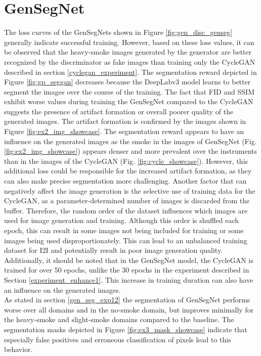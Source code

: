 \section{GenSegNet}\label{genseg_discussion}
The loss curves of the GenSegNets shown in Figure \ref{fig:gen_disc_genseg} generally indicate successful training.
However, based on these loss values, it can be observed that the heavy-smoke images generated by the generator are better recognized by the discriminator as fake images than training only the CycleGAN described in section \ref{cyclegan_experiment}.
The segmentation reward depicted in Figure \ref{fig:gp_seggan} decreases because the DeepLabv3 model learns to better segment the images over the course of the training.
The fact that FID and SSIM exhibit worse values during training the GenSegNet compared to the CycleGAN suggests the presence of artifact formation or overall poorer quality of the generated images.
The artifact formation is confirmed by the images shown in Figure \ref{fig:ex2_img_showcase}.
The segmentation reward appears to have an influence on the generated images as the smoke in the images of GenSegNet (Fig. \ref{fig:ex2_img_showcase}) appears denser and more prevalent over the instruments than in the images of the CycleGAN (Fig. \ref{fig:cycle_showcase}).
However, this additional loss could be responsible for the increased artifact formation, as they can also make precise segmentation more challenging.
Another factor that can negatively affect the image generation is the selective use of training data for the CycleGAN, as a parameter-determined number of images is discarded from the buffer. 
Therefore, the random order of the dataset influences which images are used for image generation and training.
Although this order is shuffled each epoch, this can result in some images not being included for training or some images being used disproportionately. 
This can lead to an unbalanced training dataset for I2I and potentially result in poor image generation quality.
Additionally, it should be noted that in the GenSegNet model, the CycleGAN is trained for over 50 epochs, unlike the 30 epochs in the experiment described in Section \ref{experiment_enhance1}. 
This increase in training duration can also have an influence on the generated images.\\
As stated in section \ref{gen_seg_exp12} the segmentation of GenSegNet performs worse over all domains and in the no-smoke domain, but improves minimally for the heavy-smoke and slight-smoke domains compared to the baseline.
The segmentation masks depicted in Figure \ref{fig:ex3_mask_showcase} indicate that especially false positives and erroneous classification of pixels lead to this behavior.
